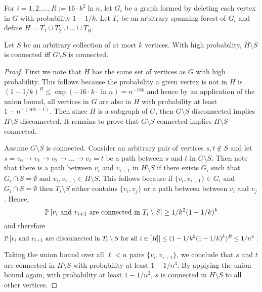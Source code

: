 For $i=1,2,\ldots, R:=16\cdot k^2 \ln n$, let $G_i$ be a graph formed by deleting each vertex in $G$ with probability $1-1/k$. Let $T_i$ be an arbitrary spanning forest of $G_i$ and define $H=T_1\cup T_2 \cup \ldots \cup T_R$.

\begin{lemma}
Let $S$ be an arbitrary collection of at most $k$ vertices. With high probability, $H\setminus S$ is connected iff $G\setminus S$ is connected.
\end{lemma}

\begin{proof}
First we note that $H$ has the same set of vertices as $G$ with high probability. This follows because the probability a given vertex is not in $H$ is $(1-1/k)^R\leq \exp(-16\cdot k \cdot \ln n)=n^{-16k}$ and hence by an application of the union bound, all vertices in $G$ are also in $H$ with probability at least $1-n^{-(16k-1)}$. Then since $H$ is a subgraph of $G$, then $G\setminus S$ disconnected implies  $H\setminus S$ disconnected. It remains to prove that $G\setminus S$ connected implies $H\setminus S$ connected.

Assume $G\setminus S$ is connected. Consider an arbitrary pair of vertices $s,t \not \in S$ and let 
$s=v_0\rightarrow v_1 \rightarrow v_2 \rightarrow \ldots \rightarrow v_\ell=t$
be a  path between $s$ and $t$ in $G\setminus S$.
Then note that there is a path between $v_i$ and $v_{i+1}$ in $H\setminus S$ if there exists $G_i$ such that $G_i\cap S=\emptyset$ and $v_i,v_{i+1}\in H\setminus S$. This follows because if $\{v_i,v_{i+1}\}\in G_i$ and $G_i\cap S=\emptyset$ then $T_i\setminus S$ either contains $\{v_i,v_j\}$ or a path between between $v_i$ and $v_j$. Hence,
\[
\mathbb P \left [ \mbox{$v_i$ and $v_{i+1}$ are connected in $T_i\setminus S$} \right ] \geq 1/k^2 (1-1/k)^k
\]
and therefore 
$$\mathbb P \left [ \mbox{$v_i$ and $v_{i+1}$ are disconnected in $T_i\setminus S$ for all $i\in [R]$} \right ] \leq (1-1/k^2 (1-1/k)^k)^R \leq 1/n^4 \ .$$

\begin{comment}
\begin{eqnarray*}
& & \prob{\mbox{$v_i$ and $v_{i+1}$ are disconnected in $T_i\setminus S$ for all $i\in [R]$}} \\
&\leq & (1-1/k^2 (1-1/k)^k)^R 
\leq 1/n^4 \ .
\end{eqnarray*}
\end{comment}

Taking the union bound over all $\ell <n$ pairs $\{v_i, v_{i+1}\}$, we conclude that 
$s$ and $t$ are connected in $H\setminus S$ with probability at least $1-1/n^3$. By applying the union bound again, with probability at least $1-1/n^2$, $s$ is connected in $H\setminus S$ to all other vertices.
\end{proof}

